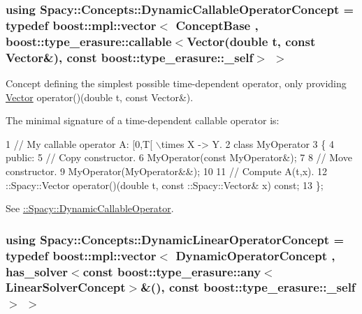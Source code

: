 \subsubsection[{Dynamic\+Callable\+Operator\+Concept}]{\setlength{\rightskip}{0pt plus 5cm}using {\bf Spacy\+::\+Concepts\+::\+Dynamic\+Callable\+Operator\+Concept} = typedef boost\+::mpl\+::vector$<$ {\bf Concept\+Base} , boost\+::type\+\_\+erasure\+::callable$<${\bf Vector}(double t, const {\bf Vector}\&), const boost\+::type\+\_\+erasure\+::\+\_\+self$>$ $>$}\label{group__ConceptGroup_ga30692db093ead5a1a074905363a2f043_ga30692db093ead5a1a074905363a2f043}


Concept defining the simplest possible time-\/dependent operator, only providing \hyperlink{classSpacy_1_1Vector}{Vector} operator()(double t, const Vector\&). 

\label{group__ConceptGroup_ga30692db093ead5a1a074905363a2f043_DynamicCallableOperatorConceptAnchor}%
\hypertarget{group__ConceptGroup_ga30692db093ead5a1a074905363a2f043_DynamicCallableOperatorConceptAnchor}{}%
The minimal signature of a time-\/dependent callable operator is\+: 
\begin{DoxyCode}
1 // My callable operator A: [0,T[ \(\backslash\)times X -> Y.
2 class MyOperator
3 \{
4 public:
5   // Copy constructor.
6   MyOperator(const MyOperator&);
7 
8   // Move constructor.
9   MyOperator(MyOperator&&);
10 
11   // Compute A(t,x).
12   ::Spacy::Vector operator()(double t, const ::Spacy::Vector& x) const;
13 \};
\end{DoxyCode}


See \hyperlink{group__SpacyGroup_ga750d55072f7a3a16a1263961147333c0_DynamicCallableOperatorAnchor}{\+:\+:Spacy\+:\+:Dynamic\+Callable\+Operator}. \hypertarget{group__ConceptGroup_ga015b0d099011a2ef73a16aa9b36a7346_ga015b0d099011a2ef73a16aa9b36a7346}{}
\subsubsection[{Dynamic\+Linear\+Operator\+Concept}]{\setlength{\rightskip}{0pt plus 5cm}using {\bf Spacy\+::\+Concepts\+::\+Dynamic\+Linear\+Operator\+Concept} = typedef boost\+::mpl\+::vector$<$ {\bf Dynamic\+Operator\+Concept} , has\+\_\+solver$<$const boost\+::type\+\_\+erasure\+::any$<${\bf Linear\+Solver\+Concept}$>$\&(), const boost\+::type\+\_\+erasure\+::\+\_\+self$>$ $>$}\label{group__ConceptGroup_ga015b0d099011a2ef73a16aa9b36a7346_ga015b0d099011a2ef73a16aa9b36a7346}


